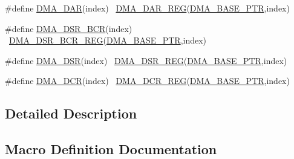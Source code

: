 \begin{DoxyCompactItemize}
\item 
\#define \hyperlink{group___d_m_a___register___accessor___macros_gaef7b39e8a16b80afa6ddce42e7ffe6e8}{D\+M\+A\+\_\+\+D\+AR}(index)                                                  ~\hyperlink{group___d_m_a___register___accessor___macros_gaff00a31c917565930c57e5ecd9fdfd8e}{D\+M\+A\+\_\+\+D\+A\+R\+\_\+\+R\+EG}(\hyperlink{group___d_m_a___peripheral_ga6997fbc1b1973e9f27170217a3bd6f22}{D\+M\+A\+\_\+\+B\+A\+S\+E\+\_\+\+P\+TR},index)
\item 
\#define \hyperlink{group___d_m_a___register___accessor___macros_ga21f0129038acd403e8efdccc0778d92f}{D\+M\+A\+\_\+\+D\+S\+R\+\_\+\+B\+CR}(index)                                          ~\hyperlink{group___d_m_a___register___accessor___macros_ga6de33913b70e7b2aba1c7486827daf2a}{D\+M\+A\+\_\+\+D\+S\+R\+\_\+\+B\+C\+R\+\_\+\+R\+EG}(\hyperlink{group___d_m_a___peripheral_ga6997fbc1b1973e9f27170217a3bd6f22}{D\+M\+A\+\_\+\+B\+A\+S\+E\+\_\+\+P\+TR},index)
\item 
\#define \hyperlink{group___d_m_a___register___accessor___macros_ga1e2a580c39117e5155bc89aa3449fcb1}{D\+M\+A\+\_\+\+D\+SR}(index)                                                  ~\hyperlink{group___d_m_a___register___accessor___macros_ga1e8cedd9bdbe33d859c60b86b0a6b3b1}{D\+M\+A\+\_\+\+D\+S\+R\+\_\+\+R\+EG}(\hyperlink{group___d_m_a___peripheral_ga6997fbc1b1973e9f27170217a3bd6f22}{D\+M\+A\+\_\+\+B\+A\+S\+E\+\_\+\+P\+TR},index)
\item 
\#define \hyperlink{group___d_m_a___register___accessor___macros_ga8f4a66782bf3653a172fc177cd6330a1}{D\+M\+A\+\_\+\+D\+CR}(index)                                                  ~\hyperlink{group___d_m_a___register___accessor___macros_ga1e1ba3e89c784e36af7e50ef3f415a2d}{D\+M\+A\+\_\+\+D\+C\+R\+\_\+\+R\+EG}(\hyperlink{group___d_m_a___peripheral_ga6997fbc1b1973e9f27170217a3bd6f22}{D\+M\+A\+\_\+\+B\+A\+S\+E\+\_\+\+P\+TR},index)
\end{DoxyCompactItemize}


\subsection{Detailed Description}


\subsection{Macro Definition Documentation}
